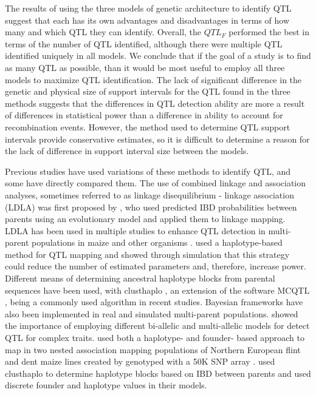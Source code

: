 \documentclass[article,9pt,twocolumn,twoside]{rilabRxiv}
\begin{document}
The results of using the three models of genetic architecture to identify QTL suggest that each has its own advantages and disadvantages in terms of how many and which QTL they can identify.
Overall, the $QTL_F$ performed the best in terms of the number of QTL identified, although there were multiple QTL identified uniquely in all models.
We conclude that if the goal of a study is to find as many QTL as possible, than it would be most useful to employ all three models to maximize QTL identification.
The lack of significant difference in the genetic and physical size of support intervals for the QTL found in the three methods suggests that the differences in QTL detection ability are more a result of differences in statistical power than a difference in ability to account for recombination events.
However, the method used to determine QTL support intervals provide conservative estimates, so it is difficult to determine a reason for the lack of difference in support interval size between the models.

Previous studies have used variations of these methods to identify QTL, and some have directly compared them.
The use of combined linkage and association analyses, sometimes referred to as linkage disequilibrium - linkage association (LDLA) was first proposed by \cite{Meuwissen}, who used predicted IBD probabilities between parents using an evolutionary model and applied them to linkage mapping.
LDLA has been used in multiple studies to enhance QTL detection in multi-parent populations in maize \citep{Giraud2,Yu2,McMullen} and other organisms \citep{Herault}.
\cite{Jansen} used a haplotype-based method for QTL mapping and showed through simulation that this strategy could reduce the number of estimated parameters and, therefore, increase power.
Different means of determining ancestral haplotype blocks from parental sequences have been used, with clusthaplo \citep{Leroux}, an extension of the software MCQTL \citep{Jourjon}, being a commonly used algorithm in recent studies.
Bayesian frameworks have also been implemented in real \citep{PerezEnciso} and simulated \citep{Bink} multi-parent populations.
\cite{Bardol} showed the importance of employing different bi-allelic and multi-allelic models for detect QTL for complex traits.
\cite{Giraud} used both a haplotype- and founder- based approach to map in two nested association mapping populations of Northern European flint and dent maize lines created by \cite{Bauer} genotyped with a 50K SNP array \citep{Ganal}.
\cite{Giraud} used clusthaplo to determine haplotype blocks based on IBD between parents and used discrete founder and haplotype values in their models.
\end{document}
